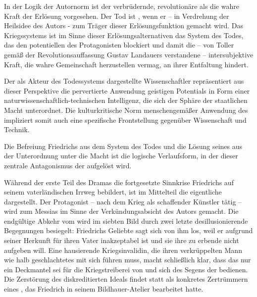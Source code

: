 In der Logik der Autornorm ist der verbrüdernde, revolutionäre \Cite{Geist}
als die wahre Kraft der Erlösung vorgesehen. Der Tod ist \Cite{Feind des
  Geistes}, wenn er -- in Verdrehung der Heilsidee des Autors - zum Träger
dieser Erlösungsfunktion gemacht wird. Das Kriegssystems ist im Sinne
dieser Erlösungsalternativen das System des Todes, das den potentiellen
\Cite{Geist} des Protagonisten blockiert und damit die -- von Toller gemäß der
Revolutionsauffassung Gustav Landauers verstandene -- intersubjektive Kraft,
die wahre Gemeinschaft herzustellen vermag, an ihrer Entfaltung hindert.

Der als Akteur des Todessystems dargestellte Wissenschaftler repräsentiert
aus dieser Perspektive die pervertierte Anwendung geistigen Potentials in Form
einer naturwissenschaftlich-technischen Intelligenz, die sich der Sphäre der
staatlichen Macht unterordnet. Die kulturkritische Norm menschengemäßer
Anwendung des \Cite{Geistes} impliziert somit auch eine spezifische Frontstellung
gegenüber Wissenschaft und Technik.

Die Befreiung Friedrichs aus dem System des Todes und die Lösung seines
\Cite{Geistes} aus der Unterordnung unter die Macht ist die logische
Verlaufsform, in der dieser zentrale Antagonismus der
 aufgelöst wird.


Während der erste Teil des Dramas die fortgesetzte Sinnkrise Friedrichs auf
seinem vaterländischen Irrweg bebildert, ist im Mittelteil die eigentliche
 dargestellt. Der Protagonist -- nach dem Krieg als
schaffender Künstler tätig -- wird zum Messias im Sinne der
Verkündungsabsicht des Autors gemacht.  Die endgültige Abkehr vom
\Cite{Vaterland} wird im siebten Bild durch zwei letzte desillusionierende
Begegnungen besiegelt: Friedrichs Geliebte sagt sich von
ihm los, weil er aufgrund seiner Herkunft für ihren Vater inakzeptabel ist und
sie ihre zu erbende \Cite{Scholle}  nicht aufgeben will.
Eine hausierende Kriegsinvalidin, die ihren verkrüppelten Mann wie halb geschlachtetes
\Cite{Vieh} mit sich führen muss, macht schließlich klar, dass das
\Cite{Vaterland} nur ein Deckmantel sei für die Kriegstreiberei von \Cite{Reichen,
  die prassen}  und sich des Segens der \Cite{Kupplerin
  Kirche}  bedienen. Die
Zerstörung des diskreditierten Ideals findet statt als konkretes Zertrümmern eines
\Cite{Symbol[s] [..] des siegreichen Vaterlandes} , das
Friedrich in seinem Bildhauer-Atelier bearbeitet hatte.

